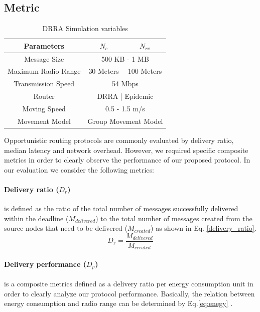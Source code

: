 \subsection{Metric}
\begin{table}[!t]
	\renewcommand{\arraystretch}{1.3}
	\caption{DRRA Simulation variables}
	\label{table_parameters}
	\centering
	\begin{tabular}{|c|c|c|}
		\hline
		Parameters         &  $N_{c}$ & $N_{rv}$ \\ \hline
		Message Size       &  \multicolumn{2}{|c|}{500 KB - 1 MB}        \\ \hline
		Maximum Radio Range & 30 Meters  & 100 Meters \\ \hline
		Transmission Speed &  \multicolumn{2}{|c|}{ 54 Mbps   }        \\ \hline
		Router             & \multicolumn{2}{|c|}{ DRRA | Epidemic   } \\ \hline
		Moving Speed       &   \multicolumn{2}{|c|}{0.5 - 1.5 m/s }        \\ \hline
		Movement Model     &   \multicolumn{2}{|c|}{Group Movement Model  }      \\ \hline
	\end{tabular}
\end{table}
Opportunistic routing protocols are commonly evaluated by delivery ratio, median latency and network overhead.
However, we required specific composite metrics in order to clearly observe the performance of our proposed protocol. 
In our evaluation we consider the following metrics:

	\paragraph{Delivery ratio ($D_{r}$)} is defined as the ratio of the total number of messages successfully delivered within the deadline ($ { M }_{ delivered }$) to the total number of messages created from the source nodes that need to be delivered ($ { M }_{ created }$) as shown in Eq. \ref{delivery_ratio}.
	\begin{equation}
	\label{delivery_ratio}
	D_{r} =\frac { { M }_{ delivered } }{ { M }_{ created } } 
	\end{equation}

\paragraph{Delivery performance ($D_{p}$)} is a composite metrics defined as a delivery ratio per energy consumption unit in order to clearly analyze our protocol performance.
Basically, the relation between energy consumption and radio range can be determined by Eq.\ref{eq:enegy} \cite{Yang2010, Wang2006}.

